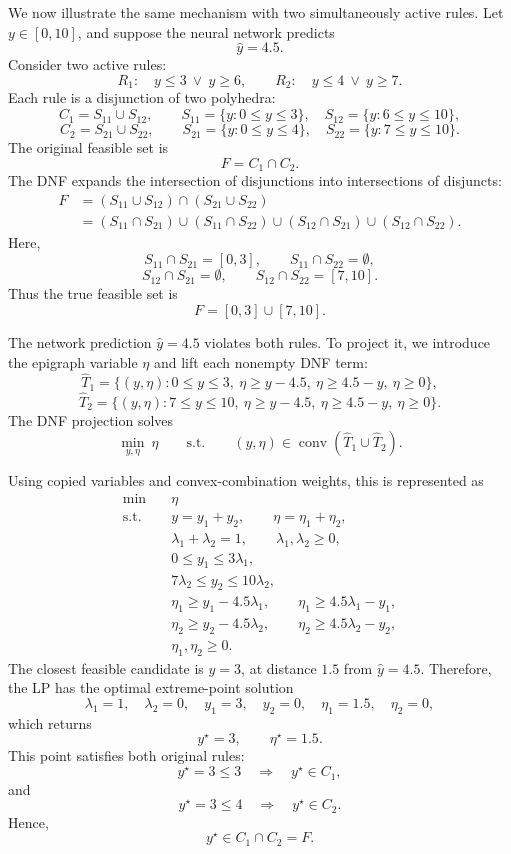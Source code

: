 \documentclass{article}
\theoremstyle{plain}
\theoremstyle{definition}
\theoremstyle{remark}
\begin{document}
We now illustrate the same mechanism with two simultaneously active rules. Let \(y\in[0,10]\), and suppose the neural network predicts
\[
    \hat y=4.5.
\]
Consider two active rules:
\[
    R_1:\quad y\le 3\ \vee\ y\ge 6,
    \qquad
    R_2:\quad y\le 4\ \vee\ y\ge 7.
\]
Each rule is a disjunction of two polyhedra:
\[
    C_1=S_{11}\cup S_{12},
    \qquad
    S_{11}=\{y:0\le y\le 3\},\quad
    S_{12}=\{y:6\le y\le 10\},
\]
\[
    C_2=S_{21}\cup S_{22},
    \qquad
    S_{21}=\{y:0\le y\le 4\},\quad
    S_{22}=\{y:7\le y\le 10\}.
\]
The original feasible set is
\[
    F=C_1\cap C_2.
\]
The DNF expands the intersection of disjunctions into intersections of disjuncts:
\[
\begin{aligned}
F
&=
(S_{11}\cup S_{12})\cap(S_{21}\cup S_{22})\\
&=
(S_{11}\cap S_{21})
\cup
(S_{11}\cap S_{22})
\cup
(S_{12}\cap S_{21})
\cup
(S_{12}\cap S_{22}).
\end{aligned}
\]
Here,
\[
    S_{11}\cap S_{21}=[0,3],
    \qquad
    S_{11}\cap S_{22}=\emptyset,
\]
\[
    S_{12}\cap S_{21}=\emptyset,
    \qquad
    S_{12}\cap S_{22}=[7,10].
\]
Thus the true feasible set is
\[
    F=[0,3]\cup[7,10].
\]

The network prediction \(\hat y=4.5\) violates both rules. To project it, we introduce the epigraph variable \(\eta\) and lift each nonempty DNF term:
\[
    \widehat T_1
    =
    \{(y,\eta):0\le y\le 3,\ \eta\ge y-4.5,\ \eta\ge 4.5-y,\ \eta\ge0\},
\]
\[
    \widehat T_2
    =
    \{(y,\eta):7\le y\le 10,\ \eta\ge y-4.5,\ \eta\ge 4.5-y,\ \eta\ge0\}.
\]
The DNF projection solves
\[
    \min_{y,\eta}\ \eta
    \qquad
    \mathrm{s.t.}
    \qquad
    (y,\eta)\in\operatorname{conv}(\widehat T_1\cup \widehat T_2).
\]

Using copied variables and convex-combination weights, this is represented as
\[
\begin{aligned}
\min \quad & \eta\\
\mathrm{s.t.}\quad
    & y=y_1+y_2,\qquad \eta=\eta_1+\eta_2,\\
    & \lambda_1+\lambda_2=1,\qquad \lambda_1,\lambda_2\ge0,\\
    & 0\le y_1\le 3\lambda_1,\\
    & 7\lambda_2\le y_2\le 10\lambda_2,\\
    & \eta_1\ge y_1-4.5\lambda_1,\qquad
      \eta_1\ge 4.5\lambda_1-y_1,\\
    & \eta_2\ge y_2-4.5\lambda_2,\qquad
      \eta_2\ge 4.5\lambda_2-y_2,\\
    & \eta_1,\eta_2\ge0.
\end{aligned}
\]
The closest feasible candidate is \(y=3\), at distance \(1.5\) from \(\hat y=4.5\). Therefore, the LP has the optimal extreme-point solution
\[
    \lambda_1=1,\quad \lambda_2=0,\quad
    y_1=3,\quad y_2=0,\quad
    \eta_1=1.5,\quad \eta_2=0,
\]
which returns
\[
    y^\star=3,
    \qquad
    \eta^\star=1.5.
\]
This point satisfies both original rules:
\[
    y^\star=3\le3
    \quad\Rightarrow\quad
    y^\star\in C_1,
\]
and
\[
    y^\star=3\le4
    \quad\Rightarrow\quad
    y^\star\in C_2.
\]
Hence,
\[
    y^\star\in C_1\cap C_2=F.
\]
\end{document}
